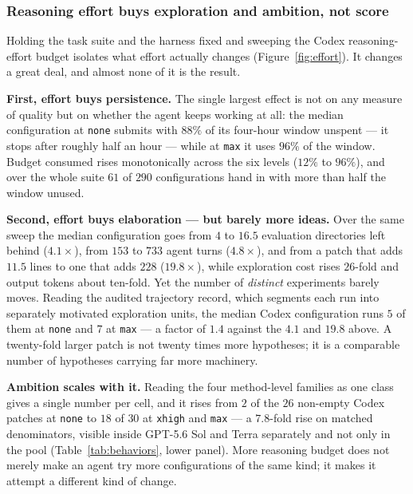 

\subsubsection{Reasoning effort buys exploration and ambition, not score}
\label{sec:effort}

Holding the task suite and the harness fixed and sweeping the Codex reasoning-effort budget isolates
what effort actually changes (Figure~\ref{fig:effort}). It changes a great deal, and almost none of
it is the result.

\textbf{First, effort buys persistence.} The single largest effect is not on any measure of quality
but on whether the agent keeps working at all: the median configuration at \texttt{none} submits with
$88\%$ of its four-hour window unspent --- it stops after roughly half an hour --- while at
\texttt{max} it uses $96\%$ of the window. Budget consumed rises monotonically across the six levels
($12\%$ to $96\%$), and over the whole suite $61$ of $290$ configurations hand in with more than half
the window unused.

\textbf{Second, effort buys elaboration --- but barely more ideas.} Over the same sweep the median
configuration goes from $4$ to $16.5$ evaluation directories left behind ($4.1\times$), from $153$ to
$733$ agent turns ($4.8\times$), and from a patch that adds $11.5$ lines to one that adds $228$
($19.8\times$), while exploration cost rises $26$-fold and output tokens about ten-fold. Yet the number
of \emph{distinct} experiments barely moves. Reading the audited trajectory record, which segments each
run into separately motivated exploration units, the median Codex configuration runs $5$ of them at
\texttt{none} and $7$ at \texttt{max} --- a factor of $1.4$ against the $4.1$ and $19.8$ above. A
twenty-fold larger patch is not twenty times more hypotheses; it is a comparable number of hypotheses
carrying far more machinery.

\textbf{Ambition scales with it.} Reading the four method-level families as one class gives a single
number per cell, and it rises from $2$ of the $26$ non-empty Codex patches at \texttt{none} to $18$ of $30$ at
\texttt{xhigh} and \texttt{max} --- a $7.8$-fold rise on matched denominators, visible inside GPT-5.6 Sol and
Terra separately and not only in the pool (Table~\ref{tab:behaviors}, lower panel). More reasoning budget does not merely make an agent try more configurations of the same
kind; it makes it attempt a different kind of change.

